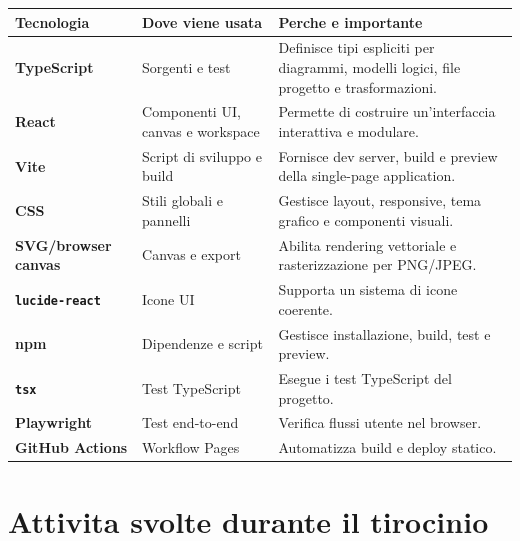 \begin{tabularx}{\textwidth}{>{\bfseries}p{3.3cm}p{4.4cm}X}
Tecnologia & Dove viene usata & Perche e importante \\
\hline
TypeScript & Sorgenti e test & Definisce tipi espliciti per diagrammi, modelli logici, file progetto e trasformazioni. \\
React & Componenti UI, canvas e workspace & Permette di costruire un'interfaccia interattiva e modulare. \\
Vite & Script di sviluppo e build & Fornisce dev server, build e preview della single-page application. \\
CSS & Stili globali e pannelli & Gestisce layout, responsive, tema grafico e componenti visuali. \\
SVG/browser canvas & Canvas e export & Abilita rendering vettoriale e rasterizzazione per PNG/JPEG. \\
\texttt{lucide-react} & Icone UI & Supporta un sistema di icone coerente. \\
npm & Dipendenze e script & Gestisce installazione, build, test e preview. \\
\texttt{tsx} & Test TypeScript & Esegue i test TypeScript del progetto. \\
Playwright & Test end-to-end & Verifica flussi utente nel browser. \\
GitHub Actions & Workflow Pages & Automatizza build e deploy statico. \\
\end{tabularx}

\section{Attivita svolte durante il tirocinio}

